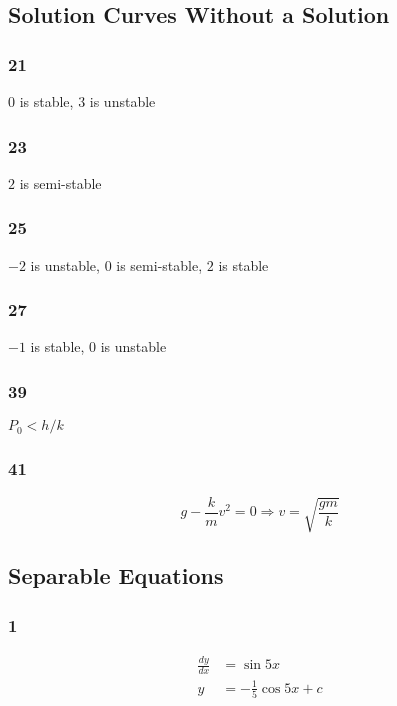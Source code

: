 \documentclass{article}
\begin{document}
\subsection{Solution Curves Without a Solution}

\subsubsection{21}

$0$ is stable, $3$ is unstable

\subsubsection{23}

$2$ is semi-stable

\subsubsection{25}

$-2$ is unstable, $0$ is semi-stable, $2$ is stable

\subsubsection{27}

$-1$ is stable, $0$ is unstable

\subsubsection{39}

$P_0 < h / k$

\subsubsection{41}

\[g - \frac{k}{m} v^2 = 0 \Rightarrow v = \sqrt{\frac{g m}{k}}\]

\subsection{Separable Equations}

\subsubsection{1}

\begin{align*}
  \frac{d y}{d x} & = \sin 5 x                  \\
  y               & = -\frac{1}{5} \cos 5 x + c
\end{align*}
\end{document}
